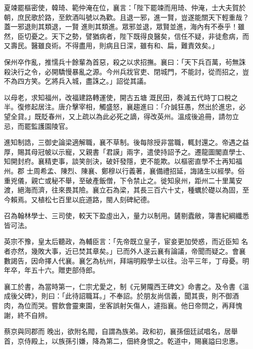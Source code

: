 \begin{pinyinscope}
 夏竦罷樞密使，韓琦、範仲淹在位，襄言：「陛下罷竦而用琦、仲淹，士大夫賀於朝，庶民歌於路，至飲酒叫號以為歡。且退一邪，進一賢，豈遂能關天下輕重哉？蓋一邪退則其類退，一賢
 進則其類進。眾邪並退，眾賢並進，海內有不泰乎！雖然，臣切憂之。天下之勢，譬猶病者，陛下既得良醫矣，信任不疑，非徒愈病，而又壽民。醫雖良術。不得盡用，則病且日深，雖有和、扁，難責效矣。」



 保州卒作亂，推懦兵十餘輩為首惡，殺之以求招撫。襄曰：「天下兵百萬，茍無誅殺決行之令，必開驕慢暴亂之源。今州兵戕官吏、閉城門，不能討，從而招之，豈不為四方笑。乞將兵入城，盡誅之。」詔從其議。



 以母老，求知福州，改福建路轉運使，開古五塘
 溉民田，奏減五代時丁口稅之半。復修起居注。唐介擊宰相，觸盛怒，襄趨進曰：「介誠狂愚，然出於進忠，必望全貸。」既貶春州，又上疏以為此必死之謫，得改英州。溫成後追冊，請勿立忌，而罷監護園陵官。



 進知制誥，三御史論梁適解職，襄不草制。後每除授非當職，輒封還之。帝遇之益厚，賜其母冠帔以示寵，又親書「君謨」兩字，遣使持詔予之。遷龍圖閣直學士、知開封府。襄精吏事，談笑剖決，破奸發隱，吏不能欺。以樞密直學不士再知福州。郡
 士周希孟、陳烈、陳襄、鄭穆以行義著，襄備禮招延，誨諸生以經學。俗重兇儀，親亡或秘不舉，至破產飯僧，下令禁止之。徙知泉州，距州二十里萬安渡，絕海而濟，往來畏其險。襄立石為梁，其長三百六十丈，種蠣於礎以為固，至今賴焉。又植松七百里以庇道路，閩人刻碑紀德。



 召為翰林學士、三司使，較天下盈虛出入，量力以制用。鏟剔蠹敝，簿書紀綱纖悉皆可法。



 英宗不豫，皇太后聽政，為輔臣言：「先帝既立皇子，宦妾更加熒惑，而近臣知
 名者亦然，幾敗大事，近已焚其章矣。」已而外人遂云襄有論議，帝聞而疑之。會襄數謁告，因命擇人代襄。襄乞為杭州，拜端明殿學士以往。治平三年，丁母憂。明年卒，年五十六。贈吏部侍郎。



 襄工於書，為當時第一，仁宗尤愛之，制《元舅隴西王碑文》命書之。及令書《溫成後父碑》，則曰：「此待詔職耳。」不奉詔。於朋友尚信義，聞其喪，則不御酒肉，為位而哭。嘗飲會靈東園，坐客誤射矢傷人，遽指襄。他日帝問之，再拜愧謝，終不自辨。



 蔡京與同郡而
 晚出，欲附名閥，自謂為族弟。政和初，襄孫佃廷試唱名，居舉首，京侍殿上，以族孫引嫌，降為第二，佃終身恨之。乾道中，賜襄謚曰忠惠。




\end{pinyinscope}

